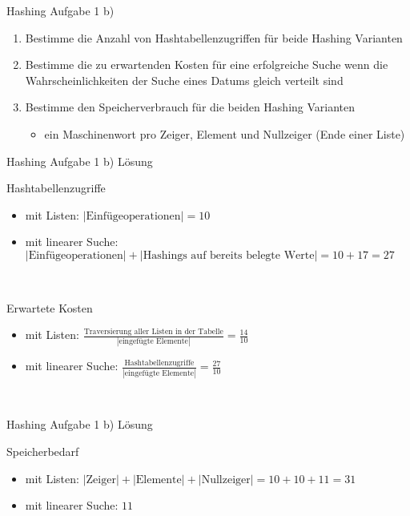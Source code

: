 	\begin{frame}{Hashing Aufgabe 1 b)}
		\begin{enumerate}
			\item Bestimme die Anzahl von Hashtabellenzugriffen für beide Hashing Varianten
			\item Bestimme die zu erwartenden Kosten für eine erfolgreiche Suche wenn die Wahrscheinlichkeiten der Suche eines Datums gleich verteilt sind
			\item Bestimme den Speicherverbrauch für die beiden Hashing Varianten
			\begin{itemize}
				\item ein Maschinenwort pro Zeiger, Element und Nullzeiger (Ende einer Liste) 
			\end{itemize}  
		\end{enumerate}
	\end{frame}

	\begin{frame} {Hashing Aufgabe 1 b) Lösung}
		\begin{block}{Hashtabellenzugriffe}
			\begin{itemize}
				\item mit Listen: $|\text{Einfügeoperationen}| = 10$
				\item mit linearer Suche: $|\text{Einfügeoperationen}| + |\text{Hashings auf bereits belegte Werte}| = 10 + 17 = 27 $
			\end{itemize}
		\end{block}
		\ \\
		\begin{block}{Erwartete Kosten}
			\begin{itemize}
				\item mit Listen: $ \frac{\text{Traversierung aller Listen in der Tabelle}}{|\text{eingefügte Elemente}|}= \frac{14}{10}  $
				\item mit linearer Suche: $ \frac{\text{Hashtabellenzugriffe}}{|\text{eingefügte Elemente}|} =  \frac{27}{10} $
			\end{itemize}
		\end{block}

		\ \\	


	\end{frame}

	\begin{frame}{Hashing Aufgabe 1 b) Lösung}
		\begin{block}{Speicherbedarf}
			\begin{itemize}
				\item mit Listen: $|\text{Zeiger}| + |\text{Elemente}| + |\text{Nullzeiger}| = 10 + 10 + 11 = 31$
				\item mit linearer Suche: $11$
			\end{itemize}
		\end{block}

	\end{frame}

